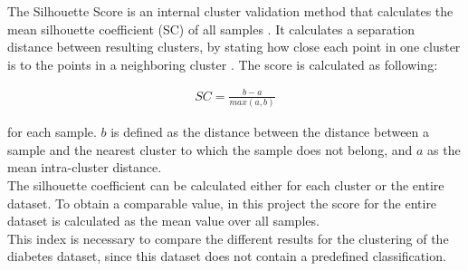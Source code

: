 The Silhouette Score is an internal cluster validation method that calculates the mean silhouette coefficient (SC) of all samples \cite{scikitlearn}. It calculates a separation distance between resulting clusters, by stating how close each point in one cluster is to the points in a neighboring cluster \cite{sil_score}. The score is calculated as following: \cite{scikitlearn}

\begin{align}
    SC = \frac{b-a}{max(a,b)}
\end{align}

for each sample. $b$ is defined as the distance between the distance between a sample and the nearest cluster to which the sample does not belong, and $a$ as the mean intra-cluster distance.\\
The silhouette coefficient can be calculated either for each cluster or the entire dataset. To obtain a comparable value, in this project the score for the entire dataset is calculated as the mean value over all samples. \cite{scikitlearn}\\
This index is necessary to compare the different results for the clustering of the diabetes dataset, since this dataset does not contain a predefined classification.